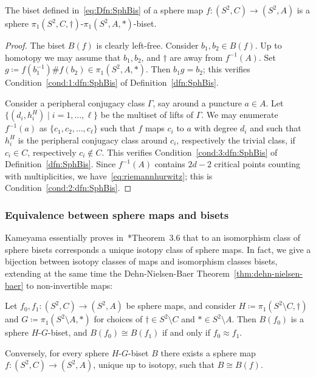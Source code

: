 \documentclass{amsart}
\begin{document}
\begin{lem}\label{lem:SphBisOfSphMap}
  The biset defined in~\eqref{eq:Dfn:SphBis} of a sphere map $f\colon
  (S^2,C)\to (S^2,A)$ is a sphere
  $\pi_1(S^2,C,\dagger)$-$\pi_1(S^2,A,*)$-biset.
\end{lem} 
\begin{proof}
  The biset $B(f)$ is clearly left-free. Consider $b_1,b_2\in
  B(f)$. Up to homotopy we may assume that $b_1,b_2$, and $\dagger$
  are away from $f^{-1}(A)$. Set
  $g\coloneqq f(b_1^{-1})\# f(b_2) \in \pi_1(S^2,A,*)$. Then
  $b_1g =b_2$; this verifies Condition~\eqref{cond:1:dfn:SphBis} of
  Definition~\ref{dfn:SphBis}.

  Consider a peripheral conjugacy class $\Gamma$, say around a
  puncture $a\in A$. Let $\{(d_i,h_i^H)\mid i=1,\dots,\ell\}$ be the
  multiset of lifts of $\Gamma$. We may enumerate $f^{-1}(a)$ as
  $\{c_1,c_2,\dots , c_\ell\}$ such that $f$ maps $c_i$ to $a$ with
  degree $d_i$ and such that $h_i^H$ is the peripheral conjugacy class
  around $c_i$, respectively the trivial class, if $c_i\in C$,
  respectively $c_i\notin C$. This verifies
  Condition~\eqref{cond:3:dfn:SphBis} of
  Definition~\ref{dfn:SphBis}. Since $f^{-1}(A)$ contains $2d-2$
  critical points counting with multiplicities, we
  have~\eqref{eq:riemannhurwitz}; this is
  Condition~\eqref{cond:2:dfn:SphBis}.
\end{proof}

\subsubsection{Equivalence between sphere maps and bisets} Kameyama essentially proves in~\cite{kameyama:thurston}*{Theorem~3.6}
that to an isomorphism class of sphere bisets corresponds a unique
isotopy class of sphere maps. In fact, we give a bijection between
isotopy classes of maps and isomorphism classes bisets, extending at
the same time the Dehn-Nielsen-Baer
Theorem~\ref{thm:dehn-nielsen-baer} to non-invertible maps:
\begin{thm}\label{thm:dehn-nielsen-baer+}
  Let $f_0,f_1\colon(S^2,C)\to(S^2,A)$ be sphere maps, and consider
  $H\coloneqq\pi_1(S^2\setminus C,\dagger)$ and
  $G\coloneqq\pi_1(S^2\setminus A,*)$ for choices of $\dagger\in
  S^2\setminus C$ and $*\in S^2\setminus A$. Then $B(f_0)$ is a sphere
  $H$-$G$-biset, and $B(f_0)\cong B(f_1)$ if and only if
  $f_0\approx f_1$.

  Conversely, for every sphere $H$-$G$-biset $B$ there exists a sphere
  map $f\colon(S^2,C)\to(S^2,A)$, unique up to isotopy, such
  that $B\cong B(f)$.
\end{thm}
\end{document}
